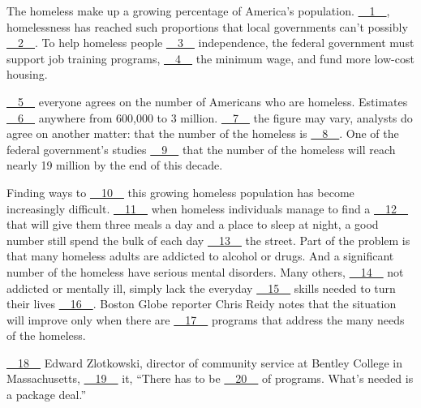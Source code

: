 The homeless make up a growing percentage of America's population. \uline{~~1~~}, homelessness has reached such proportions that local governments can't possibly \uline{~~2~~}. To help homeless people \uline{~~3~~} independence, the federal government must support job training programs, \uline{~~4~~} the minimum wage, and fund more low-cost housing.


\uline{~~5~~} everyone agrees on the number of Americans who are homeless. Estimates \uline{~~6~~} anywhere from 600,000 to 3 million. \uline{~~7~~} the figure may vary, analysts do agree on another matter: that the number of the homeless is \uline{~~8~~}. One of the federal government's studies \uline{~~9~~} that the number of the homeless will reach nearly 19 million by the end of this decade.


Finding ways to \uline{~~10~~} this growing homeless population has become increasingly difficult. \uline{~~11~~} when homeless individuals manage to find a \uline{~~12~~} that will give them three meals a day and a place to sleep at night, a good number still spend the bulk of each day \uline{~~13~~} the street. Part of the problem is that many homeless adults  are addicted to alcohol or drugs. And a significant number of the homeless have serious mental disorders. Many others, \uline{~~14~~} not addicted or mentally ill, simply lack the everyday \uline{~~15~~} skills needed to turn their lives \uline{~~16~~}. Boston Globe reporter Chris Reidy notes that the situation will improve only when there are \uline{~~17~~} programs that address the many needs of the homeless.


\uline{~~18~~} Edward Zlotkowski, director of community service at Bentley College in Massachusetts, \uline{~~19~~} it, ``There has to be \uline{~~20~~} of programs. What's needed is a package deal.''